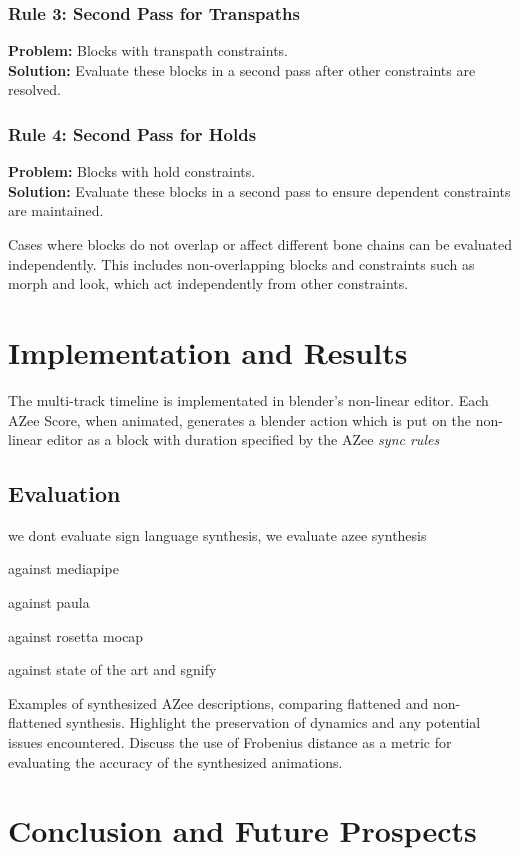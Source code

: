 \documentclass[../../main.tex]{subfiles}
\begin{document}
\subsubsection{Rule 3: Second Pass for Transpaths}
\textbf{Problem:} Blocks with transpath constraints.\\
\textbf{Solution:} Evaluate these blocks in a second pass after other constraints are resolved.

\subsubsection{Rule 4: Second Pass for Holds}
\textbf{Problem:} Blocks with hold constraints.\\
\textbf{Solution:} Evaluate these blocks in a second pass to ensure dependent constraints are maintained.

Cases where blocks do not overlap or affect different bone chains can be evaluated independently. This includes non-overlapping blocks and constraints such as morph and look, which act independently from other constraints.

\section{Implementation and Results}

The multi-track timeline is implementated in blender's non-linear editor. Each AZee Score, when animated, generates a blender action which is put on the non-linear editor as a block with duration specified by the AZee \emph{sync rules}

\subsection{Evaluation}

we dont evaluate sign language synthesis, we evaluate azee synthesis

against mediapipe 

against paula

against rosetta mocap

against state of the art and sgnify

Examples of synthesized AZee descriptions, comparing flattened and non-flattened synthesis. Highlight the preservation of dynamics and any potential issues encountered. Discuss the use of Frobenius distance as a metric for evaluating the accuracy of the synthesized animations.

\section{Conclusion and Future Prospects}
\end{document}
